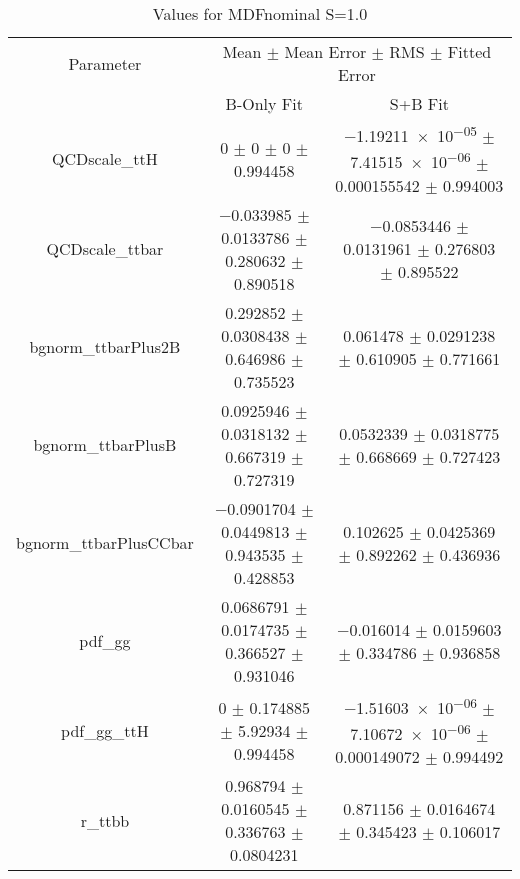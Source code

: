 \begin{table}
\centering
\caption{Values for MDFnominal S=1.0}
\begin{tabular}{ccc}
\toprule
Parameter & \multicolumn{2}{c}{Mean $\pm$ Mean Error $\pm$ RMS $\pm$ Fitted Error}\\
 & B-Only Fit & S+B Fit\\
\midrule
QCDscale\_ttH & \num{0} $\pm$ \num{0} $\pm$ \num{0} $\pm$ \num{0.994458} & \num{-1.19211e-05} $\pm$ \num{7.41515e-06} $\pm$ \num{0.000155542} $\pm$ \num{0.994003}\\
QCDscale\_ttbar & \num{-0.033985} $\pm$ \num{0.0133786} $\pm$ \num{0.280632} $\pm$ \num{0.890518} & \num{-0.0853446} $\pm$ \num{0.0131961} $\pm$ \num{0.276803} $\pm$ \num{0.895522}\\
bgnorm\_ttbarPlus2B & \num{0.292852} $\pm$ \num{0.0308438} $\pm$ \num{0.646986} $\pm$ \num{0.735523} & \num{0.061478} $\pm$ \num{0.0291238} $\pm$ \num{0.610905} $\pm$ \num{0.771661}\\
bgnorm\_ttbarPlusB & \num{0.0925946} $\pm$ \num{0.0318132} $\pm$ \num{0.667319} $\pm$ \num{0.727319} & \num{0.0532339} $\pm$ \num{0.0318775} $\pm$ \num{0.668669} $\pm$ \num{0.727423}\\
bgnorm\_ttbarPlusCCbar & \num{-0.0901704} $\pm$ \num{0.0449813} $\pm$ \num{0.943535} $\pm$ \num{0.428853} & \num{0.102625} $\pm$ \num{0.0425369} $\pm$ \num{0.892262} $\pm$ \num{0.436936}\\
pdf\_gg & \num{0.0686791} $\pm$ \num{0.0174735} $\pm$ \num{0.366527} $\pm$ \num{0.931046} & \num{-0.016014} $\pm$ \num{0.0159603} $\pm$ \num{0.334786} $\pm$ \num{0.936858}\\
pdf\_gg\_ttH & \num{0} $\pm$ \num{0.174885} $\pm$ \num{5.92934} $\pm$ \num{0.994458} & \num{-1.51603e-06} $\pm$ \num{7.10672e-06} $\pm$ \num{0.000149072} $\pm$ \num{0.994492}\\
r\_ttbb & \num{0.968794} $\pm$ \num{0.0160545} $\pm$ \num{0.336763} $\pm$ \num{0.0804231} & \num{0.871156} $\pm$ \num{0.0164674} $\pm$ \num{0.345423} $\pm$ \num{0.106017}\\
\bottomrule
\end{tabular}
\end{table}